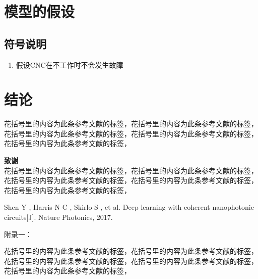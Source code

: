 \documentclass[no-math,bwprint]{YangThesis}
\begin{document}
\newpage
\section{模型的假设}

\subsection{符号说明}
\begin{enumerate}[label=\arabic*.]
\item 假设CNC在不工作时不会发生故障 
\end{enumerate}



\newpage
\section{结论}
花括号里的内容为此条参考文献的标签，花括号里的内容为此条参考文献的标签，花括号里的内容为此条参考文献的标签，花括号里的内容为此条参考文献的标签，花括号里的内容为此条参考文献的标签，

\newpage

\LARGE\textbf{致谢\\}
\large{花括号里的内容为此条参考文献的标签，花括号里的内容为此条参考文献的标签，花括号里的内容为此条参考文献的标签，花括号里的内容为此条参考文献的标签，花括号里的内容为此条参考文献的标签，
}
\newpage
\begin{thebibliography}{9}
	
	 Shen Y , Harris N C , Skirlo S , et al. Deep learning with coherent nanophotonic circuits[J]. Nature Photonics, 2017.

\end{thebibliography}
\newpage
\LARGE{附录一：\\}
花括号里的内容为此条参考文献的标签，花括号里的内容为此条参考文献的标签，花括号里的内容为此条参考文献的标签，花括号里的内容为此条参考文献的标签，花括号里的内容为此条参考文献的标签，
\end{document}
